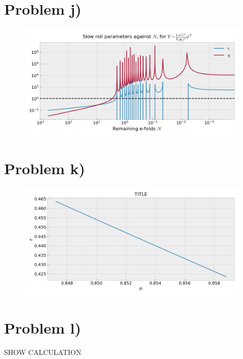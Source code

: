 \documentclass[reprint,english,notitlepage]{revtex4-1}  %
\numberwithin{equation}{section}
\begin{document}
\section{Problem j)}
\begin{figure}[h!]
	\includegraphics[width=\linewidth]{QuadraticPotential_slowroll-N.png}
	\caption{}
	\label{}
\end{figure}

\section{Problem k)}
\begin{figure}[h!]
	\includegraphics[width=\linewidth]{QuadraticPotential_slowroll-nr.png}
	\caption{}
	\label{}
\end{figure}

\section{Problem l)}
SHOW CALCULATION
\end{document}
